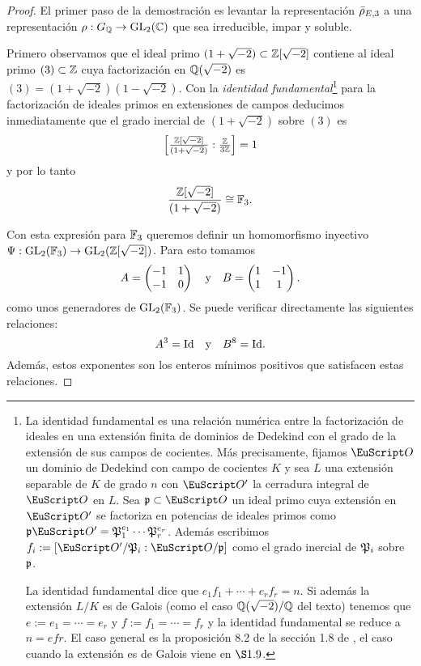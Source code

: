 \documentclass[../../tesis_maestria]{subfiles}
\begin{document}
\begin{proof}
  El primer paso de la demostraci\'on es levantar la representaci\'on $\bar{\rho}_{E,3}$ a una representaci\'on $\rho:G_{\mathbb{Q}}\rightarrow \mathrm{GL}_2(\mathbb{C})$ que sea irreducible, impar y soluble.

  Primero observamos que el ideal primo $(1+\sqrt{-2})\subset\mathbb{Z}[\sqrt{-2}]$ contiene al ideal primo $(3)\subset\mathbb{Z}$ cuya factorizaci\'on en $\mathbb{Q}(\sqrt{-2})$ es $(3)=(1+\sqrt{-2})(1-\sqrt{-2})$. Con la \emph{identidad fundamental}\footnote{La identidad fundamental es una relaci\'on num\'erica entre la factorizaci\'on de ideales en una extensi\'on finita de dominios de Dedekind con el grado de la extensi\'on de sus campos de cocientes. M\'as precisamente, fijamos $\Oo$ un dominio de Dedekind con campo de cocientes $K$ y sea $L$ una extensi\'on separable de $K$ de grado $n$ con $\Oo'$ la cerradura integral de $\Oo$ en $L$. Sea $\p\subset\Oo$ un ideal primo cuya extensi\'on en $\Oo'$ se factoriza en potencias de ideales primos como $\p\Oo'=\fP_1^{e_1}\cdots\fP_r^{e_r}$. Adem\'as escribimos $f_i:=[\Oo'/\fP_i:\Oo/\p]$ como el grado inercial de $\mathfrak{P}_i$ sobre $\mathfrak{p}$.

    La identidad fundamental dice que $e_1f_1+\cdots+e_r f_r=n$. Si adem\'as la extensi\'on $L/K$ es de Galois (como el caso $\mathbb{Q}(\sqrt{-2})/\mathbb{Q}$ del texto) tenemos que $e:=e_1=\cdots=e_r$ y $f:=f_1=\cdots=f_r$ y la identidad fundamental se reduce a $n=efr$. El caso general es la proposici\'on 8.2 de la secci\'on 1.8 de \cite{NeukirchANT}, el caso cuando la extensi\'on es de Galois viene en $\S1.9$.} para la factorizaci\'on de ideales primos en extensiones de campos deducimos inmediatamente que el grado inercial de $(1+\sqrt{-2})$ sobre $(3)$ es
  \[
    \left[\tfrac{\mathbb{Z}[\sqrt{-2}]}{(1+\sqrt{-2})}:\tfrac{\mathbb{Z}}{3\mathbb{Z}}\right]=1
  \]
y por lo tanto
  \[
    \frac{\mathbb{Z}[\sqrt{-2}]}{(1+\sqrt{-2})}\cong \mathbb{F}_3.
  \]

  Con esta expresi\'on para $\mathbb{F}_3$ queremos definir un homomorfismo inyectivo $\Psi:\mathrm{GL}_2(\mathbb{F}_3)\rightarrow\mathrm{GL}_2(\mathbb{Z}[\sqrt{-2}])$. Para esto tomamos
  \[
    A=\begin{pmatrix}-1&1\\-1&0\end{pmatrix}\quad \text{y} \quad B=\begin{pmatrix}1 & -1\\ 1 & 1\end{pmatrix}.
  \]
  como unos generadores de $\mathrm{GL}_2(\mathbb{F}_3)$. Se puede verificar directamente las siguientes relaciones:
  \[
    A^3=\mathrm{Id}\quad\text{y}\quad B^8=\mathrm{Id}.
  \]
  Además, estos exponentes son los enteros mínimos positivos que satisfacen estas relaciones.
  

\end{proof}
\end{document}
